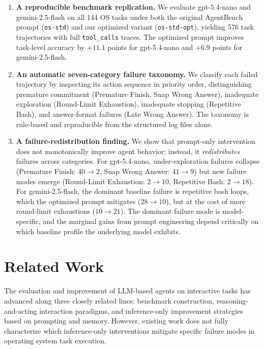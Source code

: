 \documentclass[11pt]{article}
\begin{document}
\begin{enumerate}
\setlength\itemsep{2pt}
\item \textbf{A reproducible benchmark replication.} We evaluate
gpt-5.4-nano and gemini-2.5-flash on all 144 OS tasks under both the
original AgentBench prompt (\texttt{os-std}) and our optimized variant
(\texttt{os-std-opt}), yielding 576 task trajectories with full
\texttt{tool\_calls} traces. The optimized prompt improves task-level
accuracy by $+11.1$ points for gpt-5.4-nano and $+6.9$ points for
gemini-2.5-flash.

\item \textbf{An automatic seven-category failure taxonomy.} We classify
each failed trajectory by inspecting its action sequence in priority
order, distinguishing premature commitment (Premature Finish, Snap Wrong
Answer), inadequate exploration (Round-Limit Exhaustion), inadequate
stopping (Repetitive Bash), and answer-format failures (Late Wrong
Answer). The taxonomy is rule-based and reproducible from the structured
log files alone.

\item \textbf{A failure-redistribution finding.} We show that prompt-only
intervention does not monotonically improve agent behavior; instead, it
\emph{redistributes} failures across categories. For gpt-5.4-nano,
under-exploration failures collapse (Premature Finish: $40 \to 2$, Snap
Wrong Answer: $41 \to 9$) but new failure modes emerge (Round-Limit
Exhaustion: $2 \to 10$, Repetitive Bash: $2 \to 18$). For
gemini-2.5-flash, the dominant baseline failure is repetitive bash
loops, which the optimized prompt mitigates ($28 \to 10$), but at the
cost of more round-limit exhaustions ($10 \to 21$). The dominant
failure mode is model-specific, and the marginal gains from prompt
engineering depend critically on which baseline profile the underlying
model exhibits.
\end{enumerate}

\section{Related Work}

The evaluation and improvement of LLM-based agents on interactive tasks has
advanced along three closely related lines: benchmark construction,
reasoning-and-acting interaction paradigms, and inference-only improvement
strategies based on prompting and memory. However, existing work does not
fully characterize which inference-only interventions mitigate specific
failure modes in operating system task execution.
\end{document}
